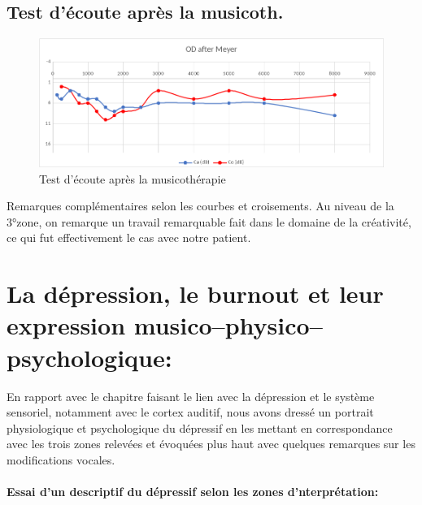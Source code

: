       


        
    	\subsection{Test d'écoute après la musicoth.}
 	
 	\begin{figure}[h]
 		\centering

 		\includegraphics[width=0.7\linewidth]{images/clinique/od_after_meyer.png}
 		\caption{Test d'écoute après la musicothérapie}
 		\label{fig:odaftermeyer}
 	\end{figure}
 
  Remarques complémentaires selon les courbes et
  croisements.
  Au niveau de la 3°zone, on remarque un travail remarquable fait dans
  le domaine de la créativité, ce qui fut effectivement le cas avec
  notre patient.
     













        
  \section{La dépression, le burnout et leur expression
    musico--physico--psychologique:}

  
En rapport  avec le chapitre faisant le lien avec la dépression et le
système sensoriel, notamment avec le cortex auditif, nous
avons dressé un portrait
physiologique et psychologique du dépressif 
  en les mettant en correspondance avec les trois zones relevées et
  évoquées plus haut avec quelques remarques sur 
les modifications vocales.
 \paragraph{Essai d'un descriptif du dépressif selon les zones d'nterprétation:}

